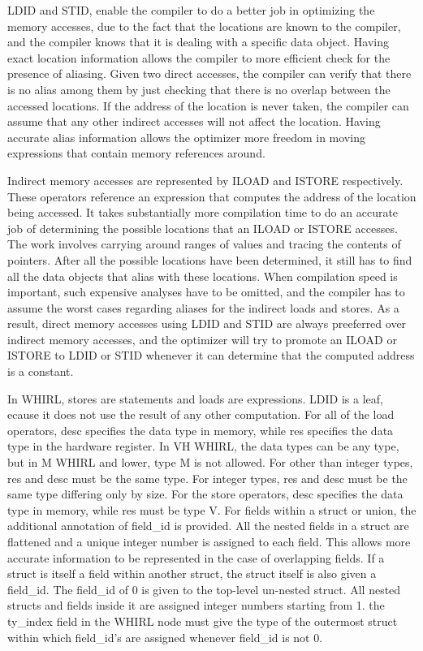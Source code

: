 %
LDID and
%
STID, enable the compiler to do a better
job in optimizing the memory accesses, due to the fact that the
locations are known to the compiler, and the compiler knows that
it is dealing with a specific data object. Having exact location
information allows the compiler to more efficient
check for the presence of aliasing. Given two direct
accesses, the compiler can verify that there is no alias among
them by just checking that there is no overlap between the accessed
locations. If the address of the location is never taken, the
compiler can assume that any other indirect accesses will not affect
the location. Having accurate alias information allows the optimizer
more freedom in moving expressions that contain memory references
around. 

Indirect memory accesses are represented by
%
ILOAD and
%
ISTORE
respectively. These operators reference an expression that computes
the address of the location being accessed. It takes substantially
more compilation time to do an accurate job of determining the
possible locations that an
%
ILOAD or
%
ISTORE accesses. The work
involves carrying around ranges of values and tracing the contents
of pointers. After all the possible locations have been determined,
it still has to find all the data objects that alias with these
locations. When compilation speed is important, such expensive
analyses have to be omitted, and the compiler has to assume the worst
cases regarding aliases for the indirect loads and stores. As a
result, direct memory accesses using
%
LDID and
%
STID are always
preeferred over indirect memory accesses, and the optimizer 
will try to promote an
%
ILOAD or
%
ISTORE to
%
LDID or
%
STID whenever it can
determine that the computed address is a constant.

In WHIRL, stores are statements and loads are expressions.
%
LDID is a
leaf, ecause it does not use the result of any other computation. For
all of the load operators, desc specifies the data type in memory,
while res specifies the data type in the hardware register. In VH
WHIRL, the data types can be any type, but in M WHIRL and lower,
type M is not allowed. For other than integer types, res and desc
must be the same type. For integer types, res and desc must be the
same type differing only by size. For the store operators, desc
specifies the data type in memory, while res must be type V. For
fields within a struct or union, the additional annotation of
field\_id is provided. All the nested fields in a struct are flattened
and a unique integer number is assigned to each field. This allows
more accurate information to be represented in the case of
overlapping fields. If a struct is itself a field within another
struct, the struct itself is also given a field\_id. The
field\_id of 0 is given to the top-level un-nested struct. All nested
structs and fields inside it are assigned integer numbers starting
from 1. the ty\_index field in the WHIRL node must give the type of
the outermost struct within which field\_id's are assigned whenever
field\_id is not 0.



